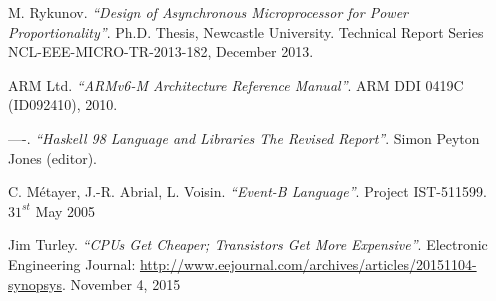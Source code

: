 \documentclass[conference]{IEEEtran}
\begin{document}
\begin{thebibliography}{1}
	M. Rykunov. \emph{``Design of Asynchronous Microprocessor for Power
	Proportionality''}. Ph.D. Thesis, Newcastle University. Technical Report Series
	NCL-EEE-MICRO-TR-2013-182, December 2013.
	
	ARM Ltd. \emph{``ARMv6-M Architecture Reference Manual''}. 
	ARM DDI 0419C (ID092410), 2010.
	
	----. \emph{``Haskell 98 Language and Libraries The Revised Report''}. 
	Simon Peyton Jones (editor).
	
	C. Métayer, J.-R. Abrial, L. Voisin. \emph{``Event-B Language''}. 
	Project IST-511599. $31^{st}$ May 2005
	
	Jim Turley. \emph{``CPUs Get Cheaper; Transistors Get More Expensive''}. Electronic
	Engineering Journal: \url{http://www.eejournal.com/archives/articles/20151104-synopsys}.
	November 4, 2015
	
\end{thebibliography}
\end{document}
